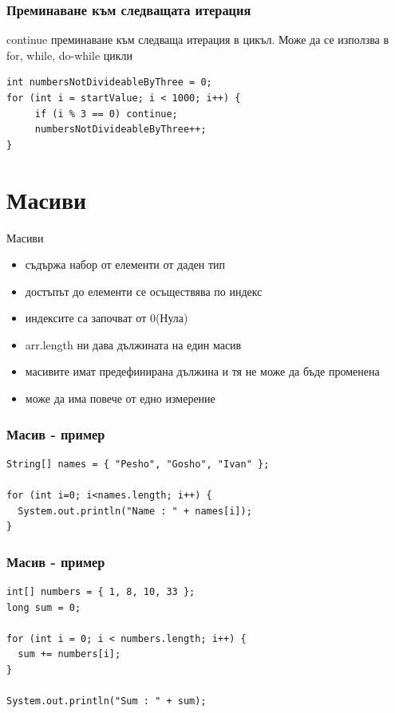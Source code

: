 \documentclass{beamer}
\begin{document}
\begin{frame}[fragile]
  \frametitle{Преминаване към следващата итерация}
  \transdissolve
  \transglitter[direction=90]
  \begin{block}{continue}
    преминаване към следваща
    итерация в цикъл. Може да се
    използва в for, while, do-while цикли
  \end{block}
\begin{lstlisting}
int numbersNotDivideableByThree = 0;
for (int i = startValue; i < 1000; i++) {
     if (i % 3 == 0) continue;
     numbersNotDivideableByThree++; 
}
\end{lstlisting}
\end{frame}

\section{Масиви}

\begin{frame}{Масиви}
  \transdissolve
  \begin{itemize}
    \item съдържа набор от елементи от даден тип
    \item достъпът до елементи се осъществява по индекс
    \item индексите са започват от 0(Нула)
    \item arr.length ни дава дължината на един масив
    \item масивите имат предефинирана дължина и тя не може да бъде променена
    \item може да има повече от едно измерение
  \end{itemize}

\end{frame}

\begin{frame}[fragile]
  \frametitle{Масив - пример}
  \transdissolve
\begin{lstlisting}
String[] names = { "Pesho", "Gosho", "Ivan" };

for (int i=0; i<names.length; i++) {
  System.out.println("Name : " + names[i]);
}
\end{lstlisting}
\end{frame}

\begin{frame}[fragile]
  \frametitle{Масив - пример}
  \transdissolve
\begin{lstlisting}
int[] numbers = { 1, 8, 10, 33 };
long sum = 0;

for (int i = 0; i < numbers.length; i++) {
  sum += numbers[i];
}

System.out.println("Sum : " + sum);
\end{lstlisting}
\end{frame}
\end{document}
